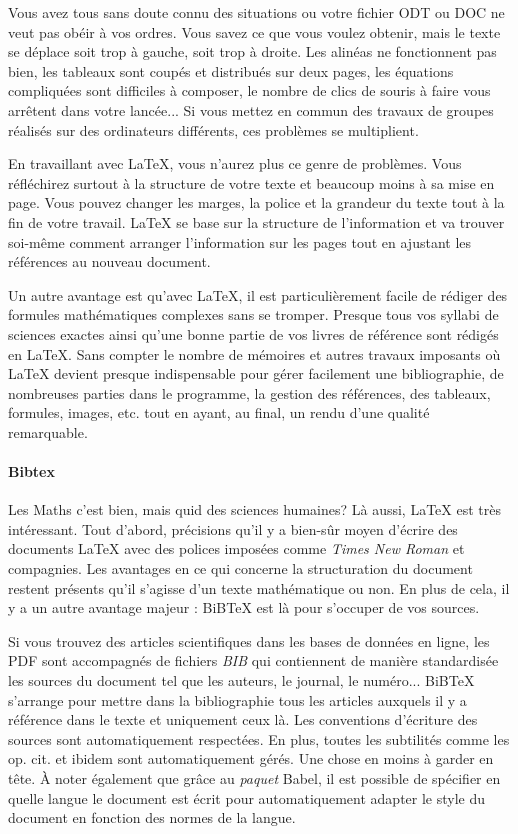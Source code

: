 Vous avez tous sans doute connu des situations ou votre fichier ODT ou DOC ne veut pas obéir à vos ordres. Vous savez ce que vous voulez obtenir, mais le texte se déplace soit trop à gauche, soit trop à droite. Les alinéas ne fonctionnent pas bien, les tableaux sont coupés et distribués sur deux pages, les équations compliquées sont difficiles à composer, le nombre de clics de souris à faire vous arrêtent dans votre lancée... Si vous mettez en commun des travaux de groupes réalisés sur des ordinateurs différents, ces problèmes se multiplient.

En travaillant avec \LaTeX{}, vous n'aurez plus ce genre de problèmes. Vous réfléchirez surtout à la structure de votre texte et beaucoup moins à sa mise en page. Vous pouvez changer les marges, la police et la grandeur du texte tout à la fin de votre travail. \LaTeX{} se base sur la structure de l'information et va trouver soi-même comment arranger l'information sur les pages tout en ajustant les références au nouveau document.

Un autre avantage est qu'avec \LaTeX{}, il est particulièrement facile de rédiger des formules mathématiques complexes sans se tromper. Presque tous vos syllabi de sciences exactes ainsi qu'une bonne partie de vos livres de référence sont rédigés en \LaTeX{}. Sans compter le nombre de mémoires et autres travaux imposants où \LaTeX{} devient presque indispensable pour gérer facilement une bibliographie, de nombreuses parties dans le programme, la gestion des références, des tableaux, formules, images, etc. tout en ayant, au final, un rendu d'une qualité remarquable.

\paragraph{Bibtex}
Les Maths c'est bien, mais quid des sciences humaines? Là aussi, \LaTeX{} est très intéressant. Tout d'abord, précisions qu'il y a bien-sûr moyen d'écrire des documents \LaTeX{} avec des polices imposées comme \textit{Times New Roman} et compagnies.
Les avantages en ce qui concerne la structuration du document restent présents qu'il s'agisse d'un texte mathématique ou non. En plus de cela, il y a un autre avantage majeur : BiB\TeX{} est là pour s'occuper de vos sources.

Si vous trouvez des articles scientifiques dans les bases de données en ligne, les PDF sont accompagnés de fichiers \textit{BIB} qui contiennent de manière standardisée les sources du document tel que les auteurs, le journal, le numéro... BiB\TeX{} s'arrange pour mettre dans la bibliographie tous les articles auxquels il y a référence dans le texte et uniquement ceux là. Les conventions d'écriture des sources sont automatiquement respectées. En plus, toutes les subtilités comme les op. cit. et ibidem sont automatiquement gérés. Une chose en moins à garder en tête.
À noter également que grâce au \textit{paquet} Babel, il est possible de spécifier en quelle langue le document est écrit pour automatiquement adapter le style du document en fonction des normes de la langue.

